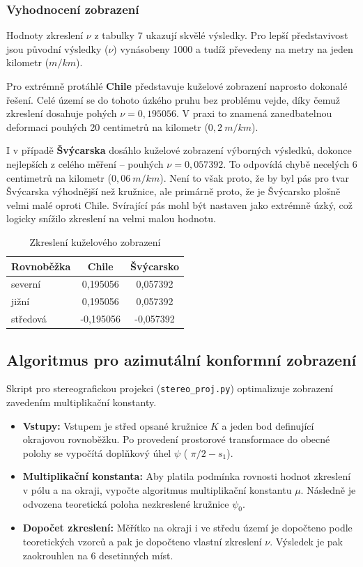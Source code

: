 \documentclass[12pt, a4paper]{article}
\begin{document}
\subsubsection{Vyhodnocení zobrazení}

Hodnoty zkreslení $\nu$ z tabulky 7 ukazují skvělé výsledky. Pro lepší představivost jsou původní výsledky ($\nu$) vynásobeny 1000 a tudíž převedeny na metry na jeden kilometr ($m/km$).

Pro extrémně protáhlé \textbf{Chile} představuje kuželové zobrazení naprosto dokonalé řešení. Celé území se do tohoto úzkého pruhu bez problému vejde, díky čemuž zkreslení dosahuje pohých $\nu = 0,195056$. V praxi to znamená zanedbatelnou deformaci pouhých 20 centimetrů na kilometr ($0,2~m/km$).

I v případě \textbf{Švýcarska} dosáhlo kuželové zobrazení výborných výsledků, dokonce nejlepších z celého měření – pouhých $\nu = 0,057392$. To odpovídá chybě necelých 6 centimetrů na kilometr ($0,06~m/km$). Není to však proto, že by byl pás pro tvar Švýcarska výhodnější než kružnice, ale primárně proto, že je Švýcarsko plošně velmi malé oproti Chile. Svírající pás mohl být nastaven jako extrémně úzký, což logicky snížilo zkreslení na velmi malou hodnotu.

\begin{table}[htbp]
    \centering
    \begin{tabular}{|l|c|c|}
        \hline
        \textbf{Rovnoběžka} & \textbf{Chile} & \textbf{Švýcarsko} \\
        \hline
        severní & 0,195056 & 0,057392 \\
        jižní & 0,195056 & 0,057392 \\
        středová & -0,195056 & -0,057392 \\
        \hline
    \end{tabular}
    \caption{Zkreslení kuželového zobrazení}
    \label{tab:kuzel_zkresleni}
\end{table}


\subsection{Algoritmus pro azimutální konformní zobrazení}
Skript pro stereografickou projekci (\texttt{stereo\_proj.py}) optimalizuje zobrazení zavedením multiplikační konstanty.
\begin{itemize}
    \item \textbf{Vstupy:} Vstupem je střed opsané kružnice $K$ a jeden bod definující okrajovou rovnoběžku. Po provedení prostorové transformace do obecné polohy se vypočítá doplňkový úhel $\psi$ ( $\pi/2 - s_1$).
    \item \textbf{Multiplikační konstanta:} Aby platila podmínka rovnosti hodnot zkreslení v pólu a na okraji, vypočte algoritmus multiplikační konstantu $\mu$. Následně je odvozena teoretická poloha nezkreslené kružnice $\psi_0$.
    \item \textbf{Dopočet zkreslení:} Měřítko na okraji i ve středu území je dopočteno podle teoretických vzorců a pak je dopočteno vlastní zkreslení $\nu$. Výsledek je pak zaokrouhlen na 6 desetinných míst.
\end{itemize}
\end{document}
